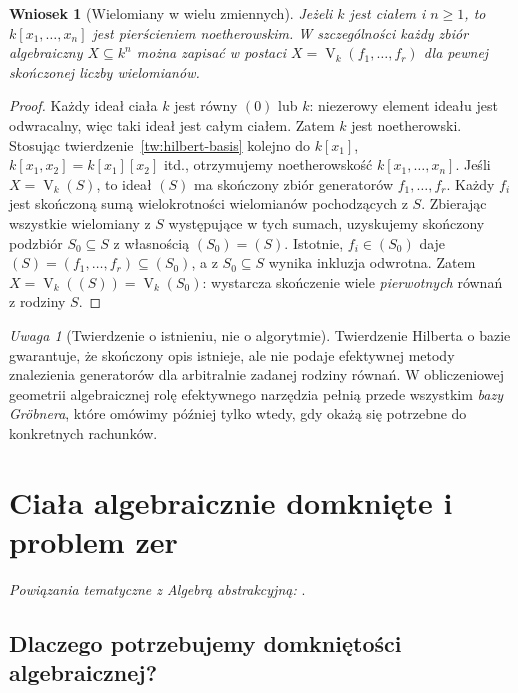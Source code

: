 \documentclass[11pt,a4paper,openany]{report}
\numberwithin{equation}{section}
\theoremstyle{plain}
\newtheorem{wniosek}[twierdzenie]{Wniosek}
\theoremstyle{definition}
\theoremstyle{remark}
\newtheorem{uwaga}[twierdzenie]{Uwaga}
\newcommand{\V}{\operatorname V}
\begin{document}
\begin{wniosek}[Wielomiany w wielu zmiennych]
\label{wn:noetherian-polys}
Jeżeli $k$ jest ciałem i $n\ge1$, to $k[x_1,\dots,x_n]$
jest pierścieniem noetherowskim. W szczególności każdy zbiór
algebraiczny $X\subseteq k^n$ można zapisać w postaci
$X=\V_k(f_1,\dots,f_r)$ dla pewnej skończonej liczby wielomianów.
\end{wniosek}
\begin{proof}
Każdy ideał ciała $k$ jest równy $(0)$ lub $k$:
niezerowy element ideału jest odwracalny, więc taki ideał jest całym
ciałem. Zatem $k$ jest noetherowski.
Stosując twierdzenie~\ref{tw:hilbert-basis} kolejno do
$k[x_1]$, $k[x_1,x_2]=k[x_1][x_2]$ itd., otrzymujemy
noetherowskość $k[x_1,\dots,x_n]$.
Jeśli $X=\V_k(S)$, to ideał $(S)$ ma skończony zbiór
generatorów $f_1,\dots,f_r$. Każdy $f_i$ jest skończoną
sumą wielokrotności wielomianów pochodzących z $S$.
Zbierając wszystkie wielomiany z $S$ występujące w tych
sumach, uzyskujemy skończony podzbiór $S_0\subseteq S$
z własnością $(S_0)=(S)$. Istotnie, $f_i\in(S_0)$ daje
$(S)=(f_1,\dots,f_r)\subseteq(S_0)$, a z $S_0\subseteq S$
wynika inkluzja odwrotna. Zatem
$X=\V_k((S))=\V_k(S_0)$: wystarcza skończenie wiele
\emph{pierwotnych} równań z rodziny $S$.
\end{proof}

\begin{uwaga}[Twierdzenie o istnieniu, nie o algorytmie]
Twierdzenie Hilberta o bazie gwarantuje, że skończony opis istnieje,
ale nie podaje efektywnej metody znalezienia generatorów dla
arbitralnie zadanej rodziny równań. W obliczeniowej geometrii
algebraicznej rolę efektywnego narzędzia pełnią przede wszystkim
\emph{bazy Gröbnera}, które omówimy później tylko wtedy,
gdy okażą się potrzebne do konkretnych rachunków.
\end{uwaga}

\section{Ciała algebraicznie domknięte i problem zer}

\noindent\emph{Powiązania tematyczne z Algebrą abstrakcyjną:} .


\subsection{Dlaczego potrzebujemy domkniętości algebraicznej?}
\end{document}
